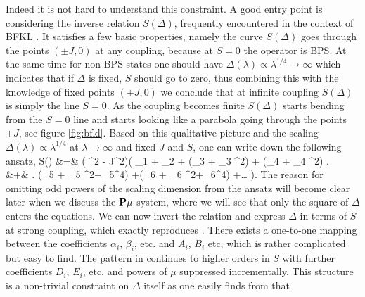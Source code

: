 Indeed it is not hard to understand this constraint.
A good entry point is considering the inverse relation $S(\Delta)$, frequently encountered in the context of BFKL \cite{bfkl}. 
It satisfies a few basic properties, namely the curve $S(\Delta)$ goes through the points $(\pm J, 0)$ at any coupling, because at $S=0$ the operator is BPS. 
At the same time for non-BPS states one should have $\Delta(\lambda)\propto \lambda^{1/4}\to\infty$ \cite{Gubser:1998bc} which indicates that if $\Delta$ is fixed, $S$ should go to zero, thus combining this with the knowledge of fixed points $(\pm J, 0)$ we conclude that at infinite coupling $S(\Delta)$ is simply the line $S = 0$. 
As the coupling becomes finite $S(\Delta)$ starts bending from the $S=0$ line and starts looking like a parabola going through the points $\pm J$, see figure \ref{fig:bfkl}. 
Based on this qualitative picture and the scaling $\Delta(\lambda)\propto \lambda^{1/4}$ at $\lambda\rightarrow\infty$ and fixed $J$ and $S$, one can write down the following ansatz,
\beqa
\label{eq:sofdelta}
	S(\Delta) &=& \left( \Delta^2 - J^2\right)\Bigl( \alpha_1  + \alpha_2  + (\alpha_3 + \beta_3 \Delta^2)  + (\alpha_4 + \beta_4 \Delta^2)     \Bigr. \nn\\
	&+&
	\Bigl.
	(\alpha_5 + \beta_5 \Delta^2+\gamma_5\Delta^4) 
	+(\alpha_6 + \beta_6 \Delta^2+\gamma_6\Delta^4) 
	+\dots
	\Bigr).
\eeqa
The reason for omitting odd powers of the scaling dimension from the ansatz will become clear later when we discuss the ${\bf P}\mu$-system, where we will see that only the square of $\Delta$ enters the equations. 
We can now invert the relation and express $\Delta$ in terms of $S$ at strong coupling, which exactly reproduces . There exists a one-to-one mapping between the coefficients $\alpha_i$, $\beta_i$, etc. and $A_i$, $B_i$ etc, which is rather complicated but easy to find.
The pattern in  continues to higher orders in $S$ with further coefficients $D_i$, $E_i$, etc. and powers of $\mu$ suppressed incrementally. This structure is a non-trivial constraint on $\Delta$ itself as one easily finds from  that
